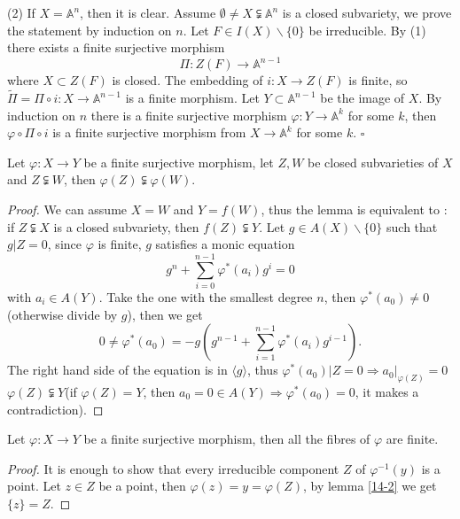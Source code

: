 	(2)	  If $ X=\mathbb{A}^{n} $, then it is clear. Assume $ \emptyset\neq X\subsetneqq\mathbb{A}^n $ is a closed subvariety, we prove the statement by induction on $ n $. Let $ F\in I(X)\backslash\lbrace 0 \rbrace $ be irreducible. By (1) there exists a finite surjective morphism
	$$
		\Pi:Z(F)\to \mathbb{A}^{n-1}
	$$
	where $ X\subset Z(F) $ is closed. The embedding of $ i:X\to Z(F) $ is finite, so $ \tilde{\Pi}=\Pi\circ i:X\to \mathbb{A}^{n-1} $ is a finite morphism. Let $ Y\subset \mathbb{A}^{n-1} $ be the image of $ X $. By induction on $ n $ there is a finite surjective morphism $ \varphi:Y\to \mathbb{A}^{k} $ for some $ k $, then $ \varphi\circ\Pi\circ i $ is a finite surjective morphism from $ X\to \mathbb{A}^{k} $ for some $ k $.
\hfill $\square $ \par
\begin{lemma}\label{14-2}
	Let $ \varphi:X\to Y $ be a finite surjective morphism, let $ Z,W $ be closed subvarieties of $ X $ and $ Z\subsetneqq W $, then $ \varphi(Z)\subsetneqq \varphi(W) $.
\end{lemma}
\begin{proof}
	We can assume $ X=W $ and $ Y=f(W) $, thus the lemma is equivalent to : if $ Z\subsetneqq X $ is a closed subvariety, then $ f(Z)\subsetneqq Y $. Let $ g\in A(X)\backslash\lbrace 0 \rbrace $ such that $ g|Z=0 $, since $ \varphi $ is finite, $ g $ satisfies a monic equation
	$$
		g^n+\sum\limits_{i=0}^{n-1}\varphi^\ast (a_i)g^i=0
	$$
	with $ a_{i}\in A(Y) $. Take the one with the smallest degree $ n $, then $ \varphi^\ast (a_0)\neq 0 $(otherwise divide by $ g $), then we get
	$$
		0\neq \varphi^\ast(a_0)=-g(g^{n-1}+\sum\limits_{i=1}^{n-1}\varphi^\ast(a_i)g^{i-1}).
	$$
	The right hand side of the equation is in $ \langle g \rangle $, thus $ \varphi^\ast (a_0)|Z=0 \Rightarrow a_0|_{\varphi(Z)}=0$ $ \varphi(Z)\subsetneqq Y $(if $ \varphi(Z)=Y $, then $ a_0=0\in A(Y)\Rightarrow \varphi^\ast(a_0)=0 $, it makes a contradiction).
\end{proof}
\begin{corollary}
	Let $ \varphi:X\to Y $ be a finite surjective morphism, then all the fibres of $ \varphi $ are finite.
\end{corollary}
\begin{proof}
	It is enough to show that every irreducible component $ Z $ of $ \varphi^{-1}(y) $ is a point. Let $ z\in Z $ be a point, then $ \varphi(z)=y=\varphi(Z) $, by lemma \ref{14-2} we get $ \lbrace z \rbrace= Z $.
\end{proof}

